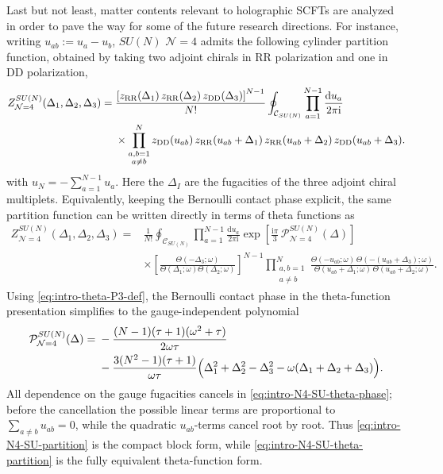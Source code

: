 \documentclass[11pt,a4paper]{article}
\numberwithin{equation}{section}
\theoremstyle{plain}
\theoremstyle{definition}
\theoremstyle{remark}
\newcommand{\ii}{\mathrm{i}}
\newcommand{\dd}{\mathrm{d}}
\begin{document}
Last but not least, matter contents relevant to holographic SCFTs are analyzed in order to pave the way for some of the future research directions. For instance, writing \(u_{ab}:=u_a-u_b\), \(SU(N)\) \(\mathcal N=4\) admits the following cylinder partition function, obtained by taking two adjoint chirals in RR polarization and one in DD polarization,
\begin{align}
Z_{\mathcal N=4}^{SU(N)}(\Delta_1,\Delta_2,\Delta_3)
={}&
\frac{
\left[
 z_{\rm RR}(\Delta_1)\,
 z_{\rm RR}(\Delta_2)\,
 z_{\rm DD}(\Delta_3)
\right]^{N-1}}{N!}
\oint_{\mathcal C_{SU(N)}}
\prod_{a=1}^{N-1}\frac{\dd u_a}{2\pi\ii}
\nonumber\\
&\times
\prod_{\substack{a,b=1\\a\neq b}}^{N}
 z_{\rm DD}(u_{ab})\,
 z_{\rm RR}(u_{ab}+\Delta_1)\,
 z_{\rm RR}(u_{ab}+\Delta_2)\,
 z_{\rm DD}(u_{ab}+\Delta_3).
\label{eq:intro-N4-SU-partition}
\end{align}
with \(u_N=-\sum_{a=1}^{N-1}u_a\).  Here the  \(\Delta_I\) are the fugacities of the three adjoint chiral multiplets.  Equivalently, keeping the Bernoulli contact phase explicit, the same partition function can be written directly in terms of theta functions as
\begin{align}
Z_{\mathcal N=4}^{SU(N)}(\Delta_1,\Delta_2,\Delta_3)
={}&
\frac{1}{N!}
\oint_{\mathcal C_{SU(N)}}
\prod_{a=1}^{N-1}\frac{\dd u_a}{2\pi\ii}
\exp\!\left[
\frac{\ii\pi}{3}\,\mathcal P^{SU(N)}_{\mathcal N=4}(\Delta)
\right]
\nonumber\\
&\times
\left[
\frac{\Theta(-\Delta_3;\omega)}
{\Theta(\Delta_1;\omega)\Theta(\Delta_2;\omega)}
\right]^{N-1}
\prod_{\substack{a,b=1\\a\neq b}}^{N}
\frac{
\Theta(-u_{ab};\omega)\,
\Theta(-(u_{ab}+\Delta_3);\omega)
}{
\Theta(u_{ab}+\Delta_1;\omega)\,
\Theta(u_{ab}+\Delta_2;\omega)
}.
\label{eq:intro-N4-SU-theta-partition}
\end{align}
Using \eqref{eq:intro-theta-P3-def}, the Bernoulli contact phase in the theta-function presentation simplifies to the gauge-independent polynomial
\begin{align}
\mathcal P^{SU(N)}_{\mathcal N=4}(\Delta)
={}&
-\frac{(N-1)(\tau+1)(\omega^2+\tau)}{2\omega\tau}
\nonumber\\
&-
\frac{3(N^2-1)(\tau+1)}{\omega\tau}
\Bigl(
\Delta_1^2+\Delta_2^2-\Delta_3^2
-\omega(\Delta_1+\Delta_2+\Delta_3)
\Bigr).
\label{eq:intro-N4-SU-theta-phase}
\end{align}
All dependence on the gauge fugacities cancels in \eqref{eq:intro-N4-SU-theta-phase}; before the cancellation the possible linear terms are proportional to \(\sum_{a\neq b}u_{ab}=0\), while the quadratic \(u_{ab}\)-terms cancel root by root.  Thus \eqref{eq:intro-N4-SU-partition} is the compact block form, while \eqref{eq:intro-N4-SU-theta-partition} is the fully equivalent theta-function form.
\end{document}
